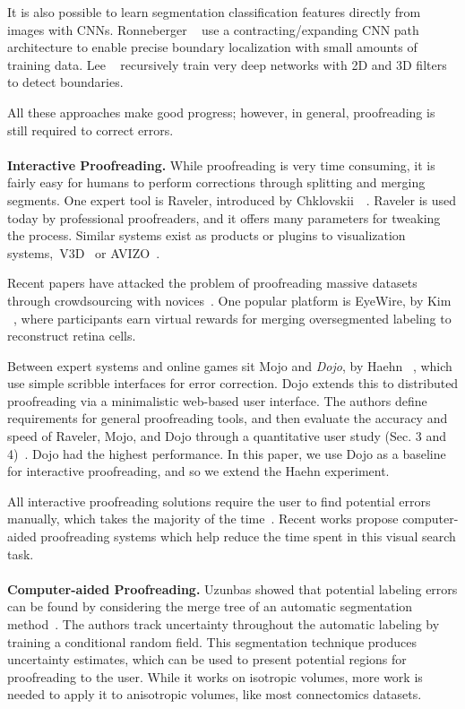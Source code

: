 It is also possible to learn segmentation classification features directly from images with CNNs. Ronneberger \etal~\cite{RonnebergerFB15} use a contracting/expanding CNN path architecture to enable precise boundary localization with small amounts of training data. Lee \etal~\cite{lee2015recursive} recursively train very deep networks with 2D and 3D filters to detect boundaries.

All these approaches make good progress; however, in general, proofreading is still required to correct errors.
\\~\\
\textbf{Interactive Proofreading.} While proofreading is very time consuming, it is fairly easy for humans to perform corrections through splitting and merging segments. One expert tool is Raveler, introduced by Chklovskii~\etal~\cite{chklovskii2010, raveler}. Raveler is used today by professional proofreaders, and it offers many parameters for tweaking the process. Similar systems exist as products or plugins to visualization systems,~\eg V3D~\cite{proofreading_bottleneck} or AVIZO~\cite{markus_proofreading}. 

Recent papers have attacked the problem of proofreading massive datasets through crowdsourcing with novices~\cite{saalfeld09,anderson2011,Giuly2013DP2}. One popular platform is EyeWire, by Kim \etal~\cite{eyewire_nature}, where participants earn virtual rewards for merging oversegmented labeling to reconstruct retina cells.

Between expert systems and online games sit Mojo and \textit{Dojo}, by Haehn \etal~\cite{haehn_dojo_2014,Neuroblocks}, which use simple scribble interfaces for error correction. Dojo extends this to distributed proofreading via a minimalistic web-based user interface. The authors define requirements for general proofreading tools, and then evaluate the accuracy and speed of Raveler, Mojo, and Dojo through a quantitative user study (Sec. 3 and 4)~\cite{haehn_dojo_2014}. Dojo had the highest performance. In this paper, we use Dojo as a baseline for interactive proofreading, and so we extend the Haehn \etal experiment.

All interactive proofreading solutions require the user to find potential errors manually, which takes the majority of the time~\cite{proofreading_bottleneck,haehn_dojo_2014}. Recent works propose computer-aided proofreading systems which help reduce the time spent in this visual search task.
\\~\\
\textbf{Computer-aided Proofreading.} Uzunbas \etal showed that potential labeling errors can be found by considering the merge tree of an automatic segmentation method~\cite{uzunbas}. The authors track uncertainty throughout the automatic labeling by training a conditional random field. This segmentation technique produces uncertainty estimates, which can be used to present potential regions for proofreading to the user. While it works on isotropic volumes, more work is needed to apply it to anisotropic volumes, like most connectomics datasets.

